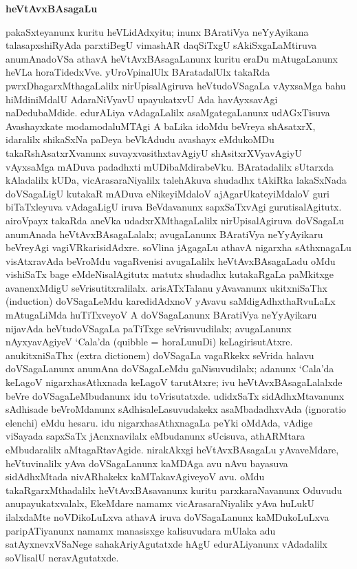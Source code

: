\bigskip
\begin{center}
{\Large\bf heVtAvxBAsagaLu}
\end{center}

pakaSxteyanunx kuritu heVLidAdxyitu; inunx BAratiVya neYyAyikana talasapxshiR\-yAda parxtiBegU vimashAR daqSiTxgU sAkiSxgaLaMtiruva anumAnadoVSa athavA heVtAvx\-BAsagaLanunx kuritu eraDu mAtugaLanunx heVLa horaTidedxVve. yUroVpinalUlx BAratadalUlx takaRda pwrxDhagarxMthagaLalilx nirUpisalAgiruva heVtudoVSagaLa vAyxsaMga bahu hiMdiniMdalU AdaraNiVyavU upayukatxvU Ada havAyxsavAgi naDedu\-baMdide. edurALiya vAdagaLalilx asaMgategaLanunx udAGxTisuva Avashayxkate modamoda\-luMTAgi A baLika idoMdu beVreya shAsatxrX, idaralilx shikaSxNa paDeya beVkAdudu avashayx eMdu\-koMDu takaRshAsatxrXvanunx suvayxvasithxtavAgiyU shAsitxrXVyavAgiyU vAyxsaMga mADuva padadhxti mUDibaMdirabeVku. BAratadalilx sUtarxda kAladalilx kUDa, vicArasaraNiyalilx talehAkuva shudadhx tAkiRka lakaSxNada doVSagaLigU kutakaR mADuva eNikeyiMdaloV ajAgarUkateyiMdaloV guri biTaTxleyuva vAdagaLigU iruva BeVdavanunx sapxSaTx\-vAgi gurutisalAgitutx. airoVpayx takaRda aneVka udadxrXMthagaLalilx nirUpisalAgiruva doVSagaLu anumAnada heVtAvxBAsagaLalalx; avugaLanunx BAratiVya neYyAyikaru beVreyAgi vagiVRkarisidAdxre. soVlina jAgagaLu athavA nigarxha sAthxnagaLu visAtxravAda beVroMdu vagaRvenisi avugaLalilx heVtAvxBAsagaLadu oMdu vishiSaTx bage eMdeNisalAgitutx matutx shudadhx kutakaRgaLa paMkitxge avanenxMdigU seVrisutitxralilalx. arisATxTalanu yAvavanunx ukitxniSaThx {\rm(induction)} doVSagaLeMdu karedidAdxnoV yAvavu saMdigAdhxthaRvuLaLx mAtugaLiMda huTiTxveyoV A doVSagaLanunx BAratiVya neYyAyikaru nijavAda heVtudoVSagaLa paTiTxge seVrisuvudilalx; avugaLanunx nAyxyavAgiyeV `Cala'da ({\rm quibble} = horaLunuDi) keLagirisutAtxre. anukitxniSaThx {\rm(extra dictionem)} doVSagaLa vagaRkekx seVrida halavu doVSagaLanunx anumAna doVSagaLeMdu gaNisuvudilalx; \hbox{adanunx} `Cala'da keLagoV nigarxhasAthxnada keLagoV tarutAtxre; ivu heVtAvxBAsagaLalalxde beVre doVSa\-gaLeMbudanunx idu toVrisutatxde. udidxSaTx sidAdhxMtavanunx sAdhisade beVroMdanunx sAdhisa\-leLasuvudakekx asaMbadadhxvAda {\rm(ignoratio elenchi)} eMdu hesaru. idu nigarxha\-sAthxnagaLa peYki oMdAda, vAdige viSayada sapxSaTx jAcnxnavilalx eMbudanunx sUcisuva, athARMtara eMbudaralilx aMtagaRtavAgide. nirakAkxgi heVtAvxBAsagaLu yAva\-veMdare, heVtuvinalilx yAva doVSagaLanunx kaMDAga avu nAvu bayasuva sidAdhxMtada nivAR\-hakekx kaMTakavAgiveyoV avu. oMdu takaRgarxMthadalilx heVtAvxBAsavanunx kuritu parxkaraNavanunx Oduvudu anupayukatxvalalx, EkeMdare namamx vicArasaraNiyalilx yAva \hbox{huLukU} ilalxdaMte noVDikoLuLxva athavA iruva doVSagaLanunx kaMDukoLuLxva paripATi\-yanunx namamx manasisxge kalisuvudara mUlaka adu satAyxnevxVSaNege sahakAriyAgutatxde hAgU edurALiyanunx vAdadalilx soVlisalU neravAgutatxde.


